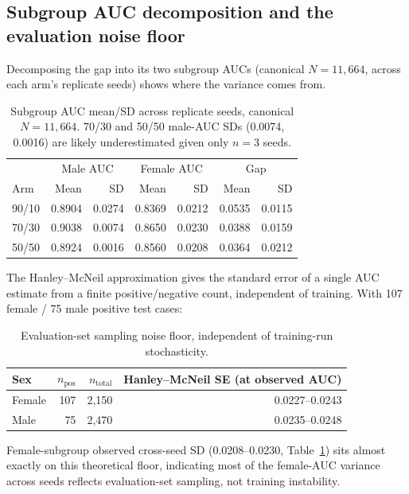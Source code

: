 \documentclass[11pt]{article}
\begin{document}
\subsection{Subgroup AUC decomposition and the evaluation noise floor}

Decomposing the gap into its two subgroup AUCs (canonical $N=11{,}664$, across each arm's replicate seeds) shows where the variance comes from.

\begin{table}[H]
\centering
\begin{tabular}{lrrrrrr}
\toprule
& \multicolumn{2}{c}{Male AUC} & \multicolumn{2}{c}{Female AUC} & \multicolumn{2}{c}{Gap} \\
Arm & Mean & SD & Mean & SD & Mean & SD \\
\midrule
90/10 & 0.8904 & 0.0274 & 0.8369 & 0.0212 & 0.0535 & 0.0115 \\
70/30 & 0.9038 & 0.0074 & 0.8650 & 0.0230 & 0.0388 & 0.0159 \\
50/50 & 0.8924 & 0.0016 & 0.8560 & 0.0208 & 0.0364 & 0.0212 \\
\bottomrule
\end{tabular}
\caption{Subgroup AUC mean/SD across replicate seeds, canonical $N=11{,}664$. 70/30 and 50/50 male-AUC SDs (0.0074, 0.0016) are likely underestimated given only $n=3$ seeds.}
\label{tab:decomp}
\end{table}

The Hanley--McNeil approximation gives the standard error of a single AUC estimate from a finite positive/negative count, independent of training. With 107 female / 75 male positive test cases:

\begin{table}[H]
\centering
\begin{tabular}{lrrr}
\toprule
Sex & $n_{\text{pos}}$ & $n_{\text{total}}$ & Hanley--McNeil SE (at observed AUC) \\
\midrule
Female & 107 & 2{,}150 & 0.0227--0.0243 \\
Male & 75 & 2{,}470 & 0.0235--0.0248 \\
\bottomrule
\end{tabular}
\caption{Evaluation-set sampling noise floor, independent of training-run stochasticity.}
\label{tab:hanley}
\end{table}

Female-subgroup observed cross-seed SD (0.0208--0.0230, Table~\ref{tab:decomp}) sits almost exactly on this theoretical floor, indicating most of the female-AUC variance across seeds reflects evaluation-set sampling, not training instability.
\end{document}
